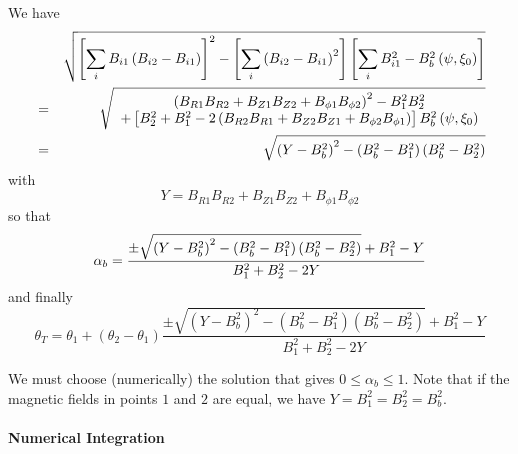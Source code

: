 We have
\begin{eqnarray}
&&\sqrt{\left[ \sum_{i}B_{i1}\left( B_{i2}-B_{i1}\right) \right] ^{2}-\left[
\sum_{i}\left( B_{i2}-B_{i1}\right) ^{2}\right] \left[
\sum_{i}B_{i1}^{2}-B_{b}^{2}\left( \psi ,\xi _{0}\right) \right] }  \nonumber
\\
&=&\sqrt{%
\begin{array}{c}
\left( B_{R1}B_{R2}+B_{Z1}B_{Z2}+B_{\phi 1}B_{\phi 2}\right)
^{2}-B_{1}^{2}B_{2}^{2} \\
+\left[ B_{2}^{2}+B_{1}^{2}-2\left( B_{R2}B_{R1}+B_{Z2}B_{Z1}+B_{\phi
2}B_{\phi 1}\right) \right] B_{b}^{2}\left( \psi ,\xi _{0}\right)
\end{array}
}  \nonumber \\
&=&\sqrt{\left( Y-B_{b}^{2}\right) ^{2}-\left( B_{b}^{2}-B_{1}^{2}\right)
\left( B_{b}^{2}-B_{2}^{2}\right) }
\end{eqnarray}
with
\begin{equation}
Y=B_{R1}B_{R2}+B_{Z1}B_{Z2}+B_{\phi 1}B_{\phi 2}
\end{equation}
so that
\begin{equation}
\alpha _{b}=\frac{\pm \sqrt{\left( Y-B_{b}^{2}\right) ^{2}-\left(
B_{b}^{2}-B_{1}^{2}\right) \left( B_{b}^{2}-B_{2}^{2}\right) }+B_{1}^{2}-Y}{%
B_{1}^{2}+B_{2}^{2}-2Y}
\end{equation}
and finally
\begin{equation}
\theta _{T}=\theta _{1}+\left( \theta _{2}-\theta _{1}\right) \frac{\pm
\sqrt{\left( Y-B_{b}^{2}\right) ^{2}-\left( B_{b}^{2}-B_{1}^{2}\right)
\left( B_{b}^{2}-B_{2}^{2}\right) }+B_{1}^{2}-Y}{B_{1}^{2}+B_{2}^{2}-2Y}
\end{equation}

We must choose (numerically) the solution that gives $0\leq \alpha _{b}\leq 1
$. Note that if the magnetic fields in points $1$ and $2$ are equal, we have
$Y=B_{1}^{2}=B_{2}^{2}=B_{b}^{2}$.

\paragraph{Numerical Integration}

